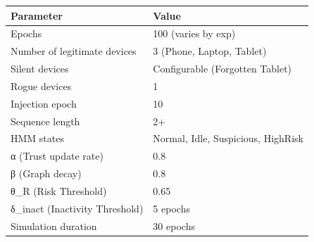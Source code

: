 \begin{tabular}{ll}
\toprule
Parameter & Value \\
\midrule
Epochs & 100 (varies by exp) \\
Number of legitimate devices & 3 (Phone, Laptop, Tablet) \\
Silent devices & Configurable (Forgotten Tablet) \\
Rogue devices & 1 \\
Injection epoch & 10 \\
Sequence length & 2+ \\
HMM states & Normal, Idle, Suspicious, HighRisk \\
α (Trust update rate) & 0.8 \\
β (Graph decay) & 0.8 \\
θ_R (Risk Threshold) & 0.65 \\
δ_inact (Inactivity Threshold) & 5 epochs \\
Simulation duration & 30 epochs \\
\bottomrule
\end{tabular}
